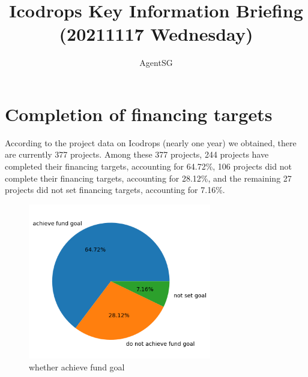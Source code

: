 \documentclass{TTP}
\renewcommand{\large}{\fontsize{14}{18pt}\selectfont}
\renewcommand{\small}{\fontsize{11}{13.6pt}\selectfont}
\newcommand{\authorformat}{\sffamily \large}              %
\newcommand{\email}{\sffamily \small \vspace{-8pt}}           %
\begin{document}
\title{Icodrops Key Information Briefing (20211117 Wednesday)}


\author{AgentSG}

\maketitle



\section{Completion of financing targets}
According to the project data on Icodrops (nearly one year) we obtained, there are currently 377 projects. Among these 377 projects, 244 projects have completed their financing targets, accounting for 64.72\%, 106 projects did not complete their financing targets, accounting for 28.12\%, and the remaining 27 projects did not set financing targets, accounting for 7.16\%.
\begin{figure}[h]
  \centering
  \includegraphics[width=8cm]{whether_achieve_fund_goal}
  \caption{whether achieve fund goal}
\end{figure}
\end{document}
